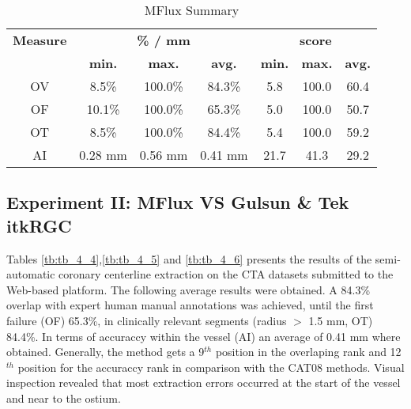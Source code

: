 \begin{table*}
\scriptsize
\caption{MFlux Summary}
\centering
\begin{tabular}{|c|ccc|ccc|}
\hline
\multicolumn{1}{|c|}{\textbf{Measure}} &\multicolumn{3}{c|}{\textbf{\% / mm}} &\multicolumn{3}{c|}{\textbf{score}}  \\
\multicolumn{1}{|c|}{\textbf{}} &\multicolumn{1}{c|}{\textbf{min.}} &\multicolumn{1}{c|}{\textbf{max.}} &\multicolumn{1}{c|}{\textbf{avg.}} &\multicolumn{1}{c|}{\textbf{min.}} &\multicolumn{1}{c|}{\textbf{max.}} &\multicolumn{1}{c|}{\textbf{avg.}}\\
\hline
OV& 8.5\%&100.0\%&84.3\%& 5.8&100.0&60.4\\
OF&10.1\%&100.0\%&65.3\%& 5.0&100.0&50.7\\
OT& 8.5\%&100.0\%&84.4\%& 5.4&100.0&59.2\\
AI&0.28 mm&0.56 mm&0.41 mm&21.7&41.3&29.2\\
\hline
\end{tabular}
\vspace{-0.3cm}
\label{tb:tb_4_3}
\normalsize
\end{table*}

\subsection{Experiment II: MFlux VS Gulsun \& Tek itkRGC}

Tables \ref{tb:tb_4_4},\ref{tb:tb_4_5} and \ref{tb:tb_4_6}  presents the results of the semi-automatic coronary centerline extraction on the CTA datasets submitted to the Web-based platform. The following average results were obtained. A 84.3\% overlap with expert human manual annotations was achieved, until the first failure (OF) 65.3\%, in clinically relevant segments (radius $>$ 1.5 mm, OT) 84.4\%. In terms of accuraccy within the vessel (AI) an average of 0.41 mm where obtained. Generally, the method gets a 9$^{th}$ position in the overlaping rank and 12$^{th}$ position for the accuraccy rank in comparison with the CAT08 methods. Visual inspection revealed that most extraction errors occurred at the start of the vessel and near to the ostium.

